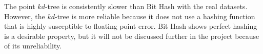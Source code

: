 The point $kd$-tree is consistently slower than Bit Hash with the real datasets. However, the $kd$-tree is more reliable because it does not use a hashing function that is highly susceptible to floating point error. Bit Hash shows perfect hashing is a desirable property, but it will not be discussed further in the project because of its unreliability.